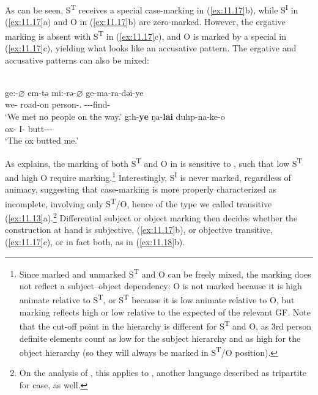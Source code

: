 \documentclass[output=paper]{langsci/langscibook}
\begin{document}
As can be seen, S\textsuperscript{T} receives a special case-marking in (\ref{ex:11.17}b),
while S\textsuperscript{I} in (\ref{ex:11.17}a) and O in (\ref{ex:11.17}b) are zero-marked. However,
the ergative marking is absent with S\textsuperscript{T} in (\ref{ex:11.17}c), and O is
marked by a special  in (\ref{ex:11.17}c), yielding what looks like an
accusative pattern. The ergative and accusative patterns can also be mixed:

\ea%
    \label{ex:11.18} \\
	\ea
		\gll ge:-\textbf{${\varnothing}$}    em-tə    mi:-rə-\textbf{${\varnothing}$}      ge-ma-ra-dəi-ye\\
			we-\Nom{}  road-on  person-\Pl.\Abs{} \Fpl-\Neg-\Tpl{}-find-\Ipfv{}\\
		\glt ‘We met no people on the way.’
	\ex
		\gll g:h-\textbf{ye}  ŋa-\textbf{lai}  duhp-na-ke-o\\
			ox-\Erg{}    I-\Acc{}  butt-\Fsg-\Pfv-\Tsg{}\\
		\glt ‘The ox butted me.’
	\z
\z

As \citet[69]{Watters2002} explains, the marking of both S\textsuperscript{T}
and O in  is sensitive to , such that low 
S\textsuperscript{T} and high  O require marking.\footnote{Since marked
and unmarked S\textsuperscript{T} and O can be freely mixed, the marking does
not reflect a subject--object dependency: O is not marked because it is high
animate relative to S\textsuperscript{T}, or S\textsuperscript{T} because it is
low animate relative to O, but marking reflects high or low  relative to
the expected  of the relevant \gls{GF}. Note that the cut-off point
in the  hierarchy is different for S\textsuperscript{T} and O, as 3rd
person definite elements count as low for the subject hierarchy and as high for
the object hierarchy (so they will always be marked in S\textsuperscript{T}/O
position).} Interestingly, S\textsuperscript{I} is never marked, regardless of
animacy, suggesting that  case-marking is more properly characterized
as incomplete, involving only S\textsuperscript{T}/O, hence of the type we
called transitive (\ref{ex:11.13}a).\footnote{On the analysis of
\citet{Lindenbergh2015}, this applies to , another language
described as tripartite for case, as well.} Differential subject or object
marking then decides whether the construction at hand is subjective,
(\ref{ex:11.17}b), or objective transitive, (\ref{ex:11.17}c), or in
fact both, as in (\ref{ex:11.18}b).
\end{document}
